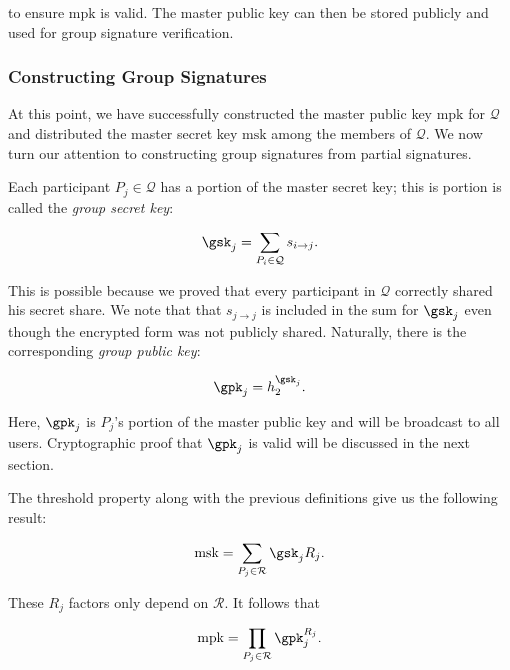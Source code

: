 \noindent
to ensure $\text{mpk}$ is valid.
The master public key can then be stored publicly and used
for group signature verification.



\subsubsection{Constructing Group Signatures}

At this point, we have successfully constructed the master public
key $\text{mpk}$ for $\mathcal{Q}$ and distributed
the master secret key $\text{msk}$ among the members of $\mathcal{Q}$.
We now turn our attention to constructing group
signatures from partial signatures.

Each participant $P_{j}\in\mathcal{Q}$ has a portion of the
master secret key; this is portion is called the \emph{group secret
key}:

\begin{equation}
    \gsk_{j} = \sum_{P_{i}\in\mathcal{Q}} s_{i\to j}.
\end{equation}

\noindent
This is possible because we proved that every participant
in $\mathcal{Q}$ correctly shared his secret share.
We note that that $s_{j\to j}$ is included in the sum for
$\gsk_{j}$ even though the encrypted form was not publicly shared.
Naturally, there is the corresponding \emph{group public key}:

\begin{equation}
    \gpk_{j} = h_{2}^{\gsk_{j}}.
\end{equation}

\noindent
Here, $\gpk_{j}$ is $P_{j}$'s portion of the master public key
and will be broadcast to all users.
Cryptographic proof that $\gpk_{j}$ is valid will be discussed
in the next section.

The threshold property along with the previous definitions give
us the following result:

\begin{equation}
    \text{msk} = \sum_{P_{j}\in\mathcal{R}} \gsk_{j}R_{j}.
\end{equation}

\noindent
These $R_{j}$ factors only depend on $\mathcal{R}$.
It follows that

\begin{equation}
    \text{mpk} = \prod_{P_{j}\in\mathcal{R}} \gpk_{j}^{R_{j}}.
\end{equation}

